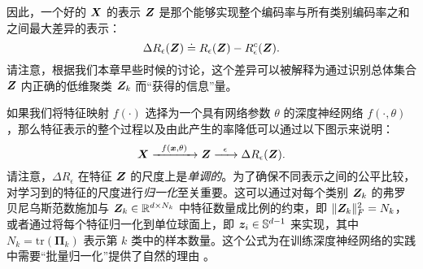 \documentclass[../../book-main_zh.tex]{subfiles}
\begin{document}

因此，一个好的 $\bm{X}$ 的表示 $\bm{Z}$ 是那个能够实现整个编码率与所有类别编码率之和之间最大差异的表示：
\begin{equation}
	\Delta R_{\epsilon}(\bm{Z}) \doteq R_{\epsilon}(\bm{Z}) - R_{\epsilon}^c(\bm{Z}).
	\label{chap4-eqn:coding-length-reduction}
\end{equation}
请注意，根据我们本章早些时候的讨论，这个差异可以被解释为通过识别总体集合 $\bm{Z}$ 内正确的低维聚类 $\bm{Z}_k$ 而“获得的信息”量。

如果我们将特征映射 $f(\cdot)$ 选择为一个具有网络参数 $\theta$ 的深度神经网络 $f(\cdot,\theta)$，那么特征表示的整个过程以及由此产生的率降低可以通过以下图示来说明：
\begin{equation}
	\bm{X}
	\xrightarrow{\hspace{2mm} f(\bm{x}, \theta)\hspace{2mm}} \bm{Z}  \xrightarrow{\hspace{2mm} \epsilon \hspace{2mm}} \Delta R_{\epsilon}(\bm{Z}).
	\label{chap4-eqn:flow}
\end{equation}
请注意，$\Delta R_{\epsilon}$ 在特征 $\bm{Z}$ 的尺度上是{\em 单调的}。为了确保不同表示之间的公平比较，对学习到的特征的尺度进行{\em 归一化}至关重要。这可以通过对每个类别 $\bm{Z}_k$ 的弗罗贝尼乌斯范数施加与 $\bm{Z}_k \in \mathbb R^{d \times N_k}$ 中特征数量成比例的约束，即 $\|\bm{Z}_k\|_F^2 = N_k$，或者通过将每个特征归一化到单位球面上，即 $\bm{z}_i \in \mathbb{S}^{d-1}$ 来实现，其中 $N_k=\mathrm{tr}(\bm \Pi_k)$ 表示第 $k$ 类中的样本数量。这个公式为在训练深度神经网络的实践中需要“批量归一化”提供了自然的理由 \cite{ioffe2015batch}。%
\end{document}
